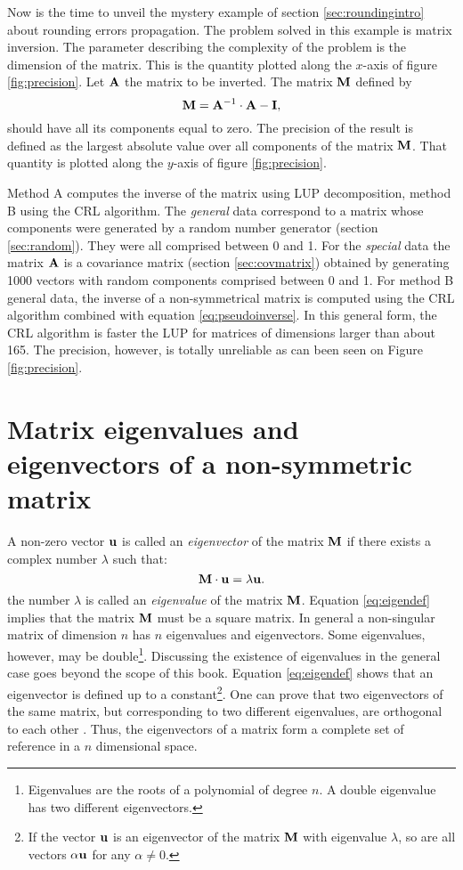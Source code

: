 \documentclass[twoside]{book}
\begin{document}
Now is the time to unveil the mystery example of section
\ref{sec:roundingintro} about rounding errors propagation. The
problem solved in this example is matrix inversion. The parameter
describing the complexity of the problem is the dimension of the
matrix. This is the quantity plotted along the $x$-axis of figure
\ref{fig:precision}. Let ${\bf A}$ the matrix to be inverted. The
matrix ${\bf M}$ defined by
\begin{equation}
  {\bf M}={\bf A}^{-1}\cdot{\bf A}-{\bf I},
\end{equation}
should have all its components equal to zero. The precision of the
result is defined as the largest absolute value over all
components of the matrix ${\bf M}$. That quantity is plotted along
the $y$-axis of figure \ref{fig:precision}.

Method A computes the inverse of the matrix using LUP
decomposition, method B using the CRL algorithm. The {\sl general}
data correspond to a matrix whose components were generated by a
random number generator (\cf section \ref{sec:random}). They were
all comprised between 0 and 1. For the {\sl special} data the
matrix ${\bf A}$ is a covariance matrix (\cf section
\ref{sec:covmatrix}) obtained by generating 1000 vectors with
random components comprised between 0 and 1. For method B general
data, the inverse of a non-symmetrical matrix is computed using
the CRL algorithm combined with equation \ref{eq:pseudoinverse}.
In this general form, the CRL algorithm is faster the LUP for
matrices of dimensions larger than about 165. The precision,
however, is totally unreliable as can been seen on Figure
\ref{fig:precision}.

\section{Matrix eigenvalues and eigenvectors of a non-symmetric matrix}
\label{sec:eigen} A non-zero vector ${\bf u}$ is called an {\sl
eigenvector} of the matrix ${\bf M}$ if there exists a complex
number $\lambda$ such that:
\begin{equation}
\label{eq:eigendef}
 {\bf M}\cdot{\bf u}=\lambda{\bf u}.
\end{equation}
the number $\lambda$ is called an {\sl eigenvalue} of the matrix
${\bf M}$. Equation \ref{eq:eigendef} implies that the matrix
${\bf M}$ must be a square matrix. In general a non-singular
matrix of dimension $n$ has $n$ eigenvalues and eigenvectors. Some
eigenvalues, however, may be double\footnote{Eigenvalues are the
roots of a polynomial of degree $n$. A double eigenvalue has two
different eigenvectors.}. Discussing the existence of eigenvalues
in the general case goes beyond the scope of this book. Equation
\ref{eq:eigendef} shows that an eigenvector is defined up to a
constant\footnote{If the vector ${\bf u}$ is an eigenvector of the
matrix ${\bf M}$ with eigenvalue $\lambda$, so are all vectors
$\alpha{\bf u}$ for any $\alpha\ne 0$.}. One can prove that two
eigenvectors of the same matrix, but corresponding to two
different eigenvalues, are orthogonal to each other \cite{Bass}.
Thus, the eigenvectors of a matrix form a complete set of
reference in a $n$ dimensional space.
\end{document}
